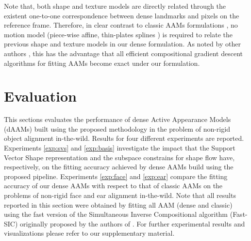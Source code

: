 Note that, both shape and texture models are directly related through the existent one-to-one correspondence between dense landmarks and pixels on the reference frame. Therefore, in clear contrast to classic AAMs formulations \cite{Cootes2001, Matthews2004}, no motion model (piece-wise affine, thin-plates splines \cite{Bookstein1989}) is required to relate the previous shape and texture models in our dense formulation. As noted by other authors \cite{Amberg2009, Tzimiropoulos2014}, this has the advantage that all efficient compositional gradient descent algorithms for fitting AAMs \cite{Papandreou2008, Matthews2004, Amberg2009, Tzimiropoulos2013, Alabort2014} become exact under our formulation. 



\chapter{Evaluation}

This sections evaluates the performance of dense Active Appearance Models (dAAMs) built using the proposed methodology in the problem of non-rigid object alignment in-the-wild. Results for four different experiments are reported. Experiments \ref{exp:svs} and \ref{exp:basis} investigate the impact that the Support Vector Shape representation and the subspace constrains for shape flow have, respectively, on the fitting accuracy achieved by dense AAMs build using the proposed pipeline. Experiments \ref{exp:face} and \ref{exp:ear} compare the fitting accuracy of our dense AAMs with respect to that of classic AAMs on the problems of non-rigid face and ear alignment in-the-wild. 
Note that all results reported in this section were obtained by fitting all AAM (dense and classic) using the fast version of the Simultaneous Inverse Compositional algorithm (Fast-SIC) originally proposed by the authors of \cite{Papandreou2008}. For further experimental results and visualizations please refer to our supplementary material. 

